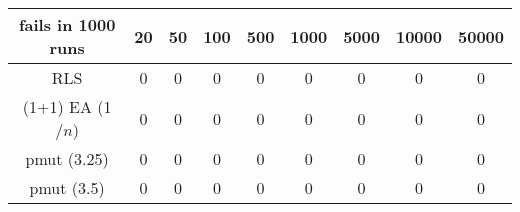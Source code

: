 \begin{tabular}[h]{ccccccccc}
fails in 1000 runs&20&50&100&500&1000&5000&10000&50000\\\hline
RLS&0&0&0&0&0&0&0&0\\
(1+1) EA (1$/n$)&0&0&0&0&0&0&0&0\\
pmut (3.25)&0&0&0&0&0&0&0&0\\
pmut (3.5)&0&0&0&0&0&0&0&0\\
\end{tabular}
